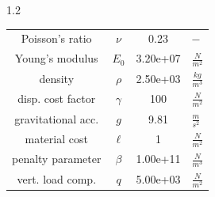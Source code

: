\documentclass[preview]{standalone}
\begin{document}
\begin{spacing}{1.2}
\begin{tabular}{cccl}
\toprule
Poisson's ratio & $\nu$ & 0.23 & $-$ \\ 
Young's modulus & $E_{0}$ & 3.20e+07 & $\frac{N}{m^2}$ \\ 
density & $\rho$ & 2.50e+03 & $\frac{kg}{m^3}$ \\ 
disp. cost factor & $\gamma$ & 100 & $\frac{N}{m^2}$ \\ 
gravitational acc. & $g$ & 9.81 & $\frac{m}{s^2}$ \\ 
material cost & $\ell$ & 1 & $\frac{N}{m^2}$ \\ 
penalty parameter & $\beta$ & 1.00e+11 & $\frac{N}{m^3}$ \\ 
vert. load comp. & $q$ & 5.00e+03 & $\frac{N}{m^2}$ \\ 
\bottomrule
\end{tabular}
\end{spacing}
\end{document}
